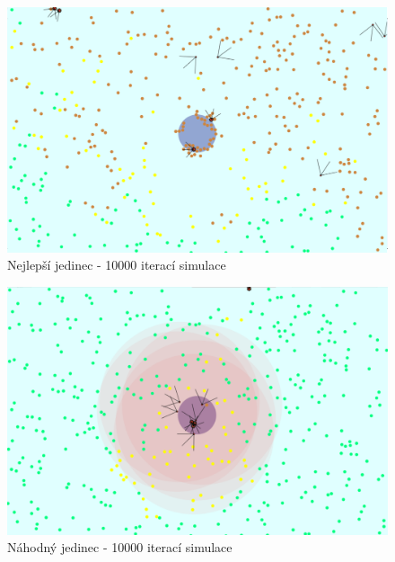 	\newpage 
	\begin{figure}[p]\centering
		\includegraphics[width=\columnwidth]{../img/WoodMap/pictures/end.png}
		\caption{Nejlepší jedinec - 10000 iterací simulace}
		\label{obr04:bestEnd}
	\end{figure}
	\begin{figure}[p]\centering
		\includegraphics[width=\columnwidth]{../img/WoodMap/pictures/EndRandom.png}
		\caption{Náhodný jedinec - 10000 iterací simulace}
		\label{obr04:randomEnd}
	\end{figure}
	\clearpage
